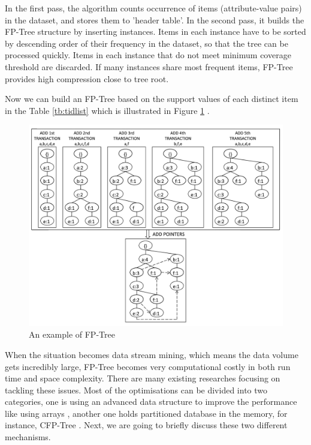In the first pass, the algorithm counts occurrence of items (attribute-value pairs) in the dataset, and stores them to 'header table'. In the second pass, it builds the FP-Tree structure by inserting instances. Items in each instance have to be sorted by descending order of their frequency in the dataset, so that the tree can be processed quickly. Items in each instance that do not meet minimum coverage threshold are discarded. If many instances share most frequent items, FP-Tree provides high compression close to tree root.

Now we can build an FP-Tree based on the support values of each distinct item in the Table \ref{tb:tidlist} which is illustrated in Figure \ref{fig:fp} \cite{survey2014}.

\begin{figure}[H]
    \centering
    \includegraphics[width=1.0\textwidth]{RelatedWorks/fptree.png}
    \caption{An example of FP-Tree \cite{survey2014}}
    \label{fig:fp}
\end{figure}

When the situation becomes data stream mining, which means the data volume gets incredibly large, FP-Tree becomes very computational costly in both run time and space complexity. There are many existing researches \cite{fpopt1, fpopt2, fpopt3, fpopt4, fpopt5, fpopt6} focusing on tackling these issues. Most of the optimisations can be divided into two categories, one is using an advanced data structure to improve the performance like using arrays \cite{fpopt3}, another one holds partitioned database in the memory, for instance, CFP-Tree \cite{fpopt6}. Next, we are going to briefly discuss these two different mechanisms.


